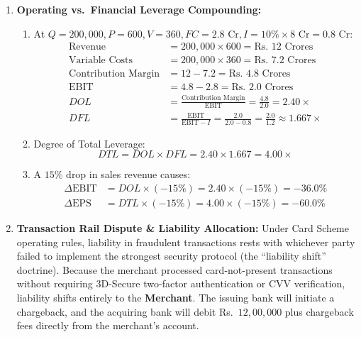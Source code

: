 \begin{enumerate}[label=\textbf{P7.\arabic*}]
    \item \textbf{Operating vs.~Financial Leverage Compounding:}
    \begin{enumerate}[label=(\alph*)]
        \item At $Q = 200{,}000, P = 600, V = 360, FC = 2.8\text{ Cr}, I = 10\% \times 8\text{ Cr} = 0.8\text{ Cr}$:
        \begin{align*}
        \text{Revenue} &= 200{,}000 \times 600 = \text{Rs.~} 12\text{ Crores} \\
        \text{Variable Costs} &= 200{,}000 \times 360 = \text{Rs.~} 7.2\text{ Crores} \\
        \text{Contribution Margin} &= 12 - 7.2 = \text{Rs.~} 4.8\text{ Crores} \\
        \text{EBIT} &= 4.8 - 2.8 = \text{Rs.~} 2.0\text{ Crores} \\
        DOL &= \frac{\text{Contribution Margin}}{\text{EBIT}} = \frac{4.8}{2.0} = \mathbf{2.40\times} \\
        DFL &= \frac{\text{EBIT}}{\text{EBIT} - I} = \frac{2.0}{2.0 - 0.8} = \frac{2.0}{1.2} \approx \mathbf{1.667\times}
        \end{align*}
        \item Degree of Total Leverage:
        \begin{equation*}
        DTL = DOL \times DFL = 2.40 \times 1.667 = \mathbf{4.00\times}
        \end{equation*}
        \item A $15\%$ drop in sales revenue causes:
        \begin{align*}
        \Delta \text{EBIT} &= DOL \times (-15\%) = 2.40 \times (-15\%) = \mathbf{-36.0\%} \\
        \Delta \text{EPS} &= DTL \times (-15\%) = 4.00 \times (-15\%) = \mathbf{-60.0\%}
        \end{align*}
    \end{enumerate}

    \item \textbf{Transaction Rail Dispute \& Liability Allocation:}
    Under Card Scheme operating rules, liability in fraudulent transactions rests with whichever party failed to implement the strongest security protocol (the ``liability shift'' doctrine). Because the merchant processed card-not-present transactions without requiring 3D-Secure two-factor authentication or CVV verification, liability shifts entirely to the \textbf{Merchant}. The issuing bank will initiate a chargeback, and the acquiring bank will debit Rs.~$12{,}00{,}000$ plus chargeback fees directly from the merchant's account.


\end{enumerate}
